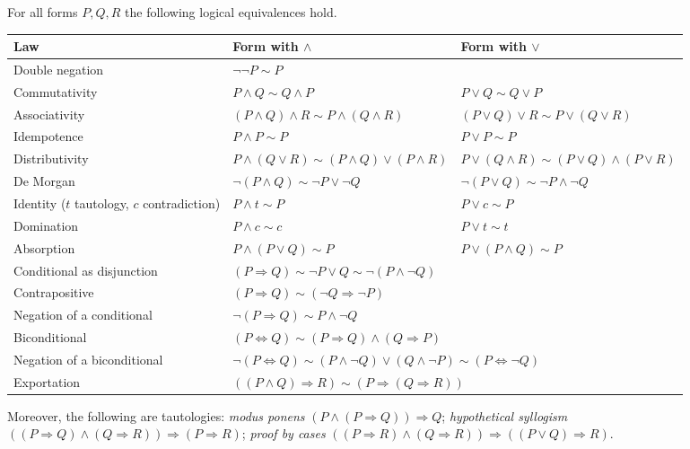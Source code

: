 \begin{theorem}\label{thm:laws}
	For all forms $P,Q,R$ the following logical equivalences hold.
	\begin{center}
		\begin{tabular}{@{}p{4.3cm}p{5.4cm}p{5.2cm}@{}}
			\toprule
			\textbf{Law} & \textbf{Form with $\wedge$} & \textbf{Form with $\vee$}\\
			\midrule
			Double negation & \multicolumn{2}{l}{$\neg\neg P\sim P$}\\
			Commutativity & $P\wedge Q\sim Q\wedge P$ & $P\vee Q\sim Q\vee P$\\
			Associativity & $(P\wedge Q)\wedge R\sim P\wedge(Q\wedge R)$ & $(P\vee Q)\vee R\sim P\vee(Q\vee R)$\\
			Idempotence & $P\wedge P\sim P$ & $P\vee P\sim P$\\
			Distributivity & $P\wedge(Q\vee R)\sim(P\wedge Q)\vee(P\wedge R)$ & $P\vee(Q\wedge R)\sim(P\vee Q)\wedge(P\vee R)$\\
			De Morgan & $\neg(P\wedge Q)\sim\neg P\vee\neg Q$ & $\neg(P\vee Q)\sim\neg P\wedge\neg Q$\\
			Identity ($t$ tautology, $c$ contradiction) & $P\wedge t\sim P$ & $P\vee c\sim P$\\
			Domination & $P\wedge c\sim c$ & $P\vee t\sim t$\\
			Absorption & $P\wedge(P\vee Q)\sim P$ & $P\vee(P\wedge Q)\sim P$\\
			\midrule
			Conditional as disjunction & \multicolumn{2}{l}{$(P\Rightarrow Q)\sim\neg P\vee Q\sim\neg(P\wedge\neg Q)$}\\
			Contrapositive & \multicolumn{2}{l}{$(P\Rightarrow Q)\sim(\neg Q\Rightarrow\neg P)$}\\
			Negation of a conditional & \multicolumn{2}{l}{$\neg(P\Rightarrow Q)\sim P\wedge\neg Q$}\\
			Biconditional & \multicolumn{2}{l}{$(P\Leftrightarrow Q)\sim(P\Rightarrow Q)\wedge(Q\Rightarrow P)$}\\
			Negation of a biconditional & \multicolumn{2}{l}{$\neg(P\Leftrightarrow Q)\sim(P\wedge\neg Q)\vee(Q\wedge\neg P)\sim(P\Leftrightarrow\neg Q)$}\\
			Exportation & \multicolumn{2}{l}{$((P\wedge Q)\Rightarrow R)\sim(P\Rightarrow(Q\Rightarrow R))$}\\
			\bottomrule
		\end{tabular}
	\end{center}
	Moreover, the following are tautologies: \emph{modus ponens} $(P\wedge(P\Rightarrow Q))\Rightarrow Q$; \emph{hypothetical syllogism} $((P\Rightarrow Q)\wedge(Q\Rightarrow R))\Rightarrow(P\Rightarrow R)$; \emph{proof by cases} $((P\Rightarrow R)\wedge(Q\Rightarrow R))\Rightarrow((P\vee Q)\Rightarrow R)$.
\end{theorem}


